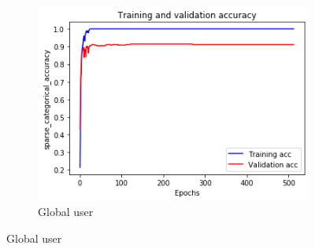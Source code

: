 \documentclass[12pt]{article}
\begin{document}
\begin{figure}[H]
\centering
\begin{subfigure}{0.45\textwidth}
    \centering
    \includegraphics[width=\textwidth]{resources/posture_global_0.125-accuracy.png}
    \caption{\small Global user}


\end{subfigure}
\end{figure}
\end{document}
